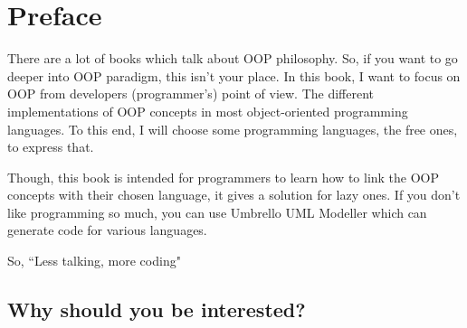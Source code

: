 \documentclass[12pt]{book}
\begin{document}
	\chapter*{Preface}
\fi

{
\merienda

There are a lot of books which talk about OOP philosophy.
So, if you want to go deeper into OOP paradigm, this isn't your place.
In this book, I want to focus on OOP from developers (programmer's) point of view.
The different implementations of OOP concepts in most object-oriented programming languages.
To this end, I will choose some programming languages, the free ones, to express that.

Though, this book is intended for programmers to learn how to link the OOP concepts with their chosen language, it gives a solution for lazy ones.
If you don't like programming so much, you can use Umbrello UML Modeller which can generate code for various languages.

}
\vfill
\begin{flushright}
So, ``Less talking, more coding"
\end{flushright}

\newpage

\section*{Why should you be interested?}
\end{document}
